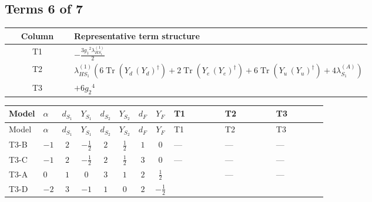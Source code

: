 \documentclass[8pt]{article}
\begin{document}
\begin{landscape}
\subsection*{Terms 6 of 7}
\begin{center}
\begin{tabular}{@{}c >{\raggedright\arraybackslash}p{0.82\linewidth}@{}}
\toprule
Column & Representative term structure \\
\midrule
T1 & \(\displaystyle -\frac{3 {g_1}^2 {\lambda_{HS_1}^{(1)}}}{2}\) \\
\midrule
T2 & \(\displaystyle {\lambda_{HS_1}^{(1)}} (6 \operatorname{Tr}\!\left({Y_d}\,\left({Y_d}\right)^{\dagger}\right)+2 \operatorname{Tr}\!\left({Y_e}\,\left({Y_e}\right)^{\dagger}\right)+6 \operatorname{Tr}\!\left({Y_u}\,\left({Y_u}\right)^{\dagger}\right)+4 {\lambda_{S_1}^{(A)}})\) \\
\midrule
T3 & \(\displaystyle +6 {g_2}^4\) \\
\midrule
\bottomrule
\end{tabular}
\end{center}
\smallskip
\tiny
\begin{longtable}{@{}llcccccc >{\raggedright\arraybackslash}p{0.21\linewidth} >{\raggedright\arraybackslash}p{0.21\linewidth} >{\raggedright\arraybackslash}p{0.21\linewidth}@{}}
\toprule
Model & $\alpha$ & $d_{S_1}$ & $Y_{S_1}$ & $d_{S_2}$ & $Y_{S_2}$ & $d_F$ & $Y_F$ & T1 & T2 & T3 \\
\midrule
\endfirsthead
\toprule
Model & $\alpha$ & $d_{S_1}$ & $Y_{S_1}$ & $d_{S_2}$ & $Y_{S_2}$ & $d_F$ & $Y_F$ & T1 & T2 & T3 \\
\midrule
\endhead
T3-B & $-1$ & $2$ & $-\frac{1}{2}$ & $2$ & $\frac{1}{2}$ & $1$ & $0$ & --- & --- & --- \\
\midrule
T3-C & $-1$ & $2$ & $-\frac{1}{2}$ & $2$ & $\frac{1}{2}$ & $3$ & $0$ & --- & --- & --- \\
\midrule
T3-A & $0$ & $1$ & $0$ & $3$ & $1$ & $2$ & $\frac{1}{2}$ & \scriptsize\adjustbox{max width=\linewidth}{$\begin{gathered} -\frac{3 {g_1}^2 {\lambda_{HS_1}^{(1)}}}{2}\end{gathered}$} & --- & --- \\
\midrule
T3-D & $-2$ & $3$ & $-1$ & $1$ & $0$ & $2$ & $-\frac{1}{2}$ & \scriptsize\adjustbox{max width=\linewidth}{$\begin{gathered} -\frac{15 {g_1}^2 {\lambda_{HS_1}^{(1)}}}{2}\end{gathered}$} & \scriptsize\adjustbox{max width=\linewidth}{$\begin{gathered} {\lambda_{HS_1}^{(1)}} (6 \operatorname{Tr}\!\left({Y_d}\,\left({Y_d}\right)^{\dagger}\right)+2 \operatorname{Tr}\!\left({Y_e}\,\left({Y_e}\right)^{\dagger}\right)+6 \operatorname{Tr}\!\left({Y_u}\,\left({Y_u}\right)^{\dagger}\right)+4 {\lambda_{S_1}^{(A)}})\end{gathered}$} & \scriptsize\adjustbox{max width=\linewidth}{$\begin{gathered} +6 {g_2}^4\end{gathered}$} \\

\end{longtable}
\end{landscape}
\end{document}
